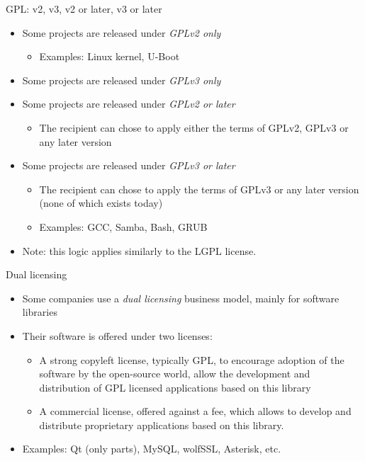 \begin{frame}{GPL: v2, v3, v2 or later, v3 or later}
  \begin{itemize}
  \item Some projects are released under {\em GPLv2 only}
    \begin{itemize}
    \item Examples: Linux kernel, U-Boot
    \end{itemize}
  \item Some projects are released under {\em GPLv3 only}
  \item Some projects are released under {\em GPLv2 or later}
    \begin{itemize}
    \item The recipient can chose to apply either the terms of GPLv2,
      GPLv3 or any later version
    \end{itemize}
  \item Some projects are released under {\em GPLv3 or later}
    \begin{itemize}
    \item The recipient can chose to apply the terms of GPLv3 or any
      later version (none of which exists today)
    \item Examples: GCC, Samba, Bash, GRUB
    \end{itemize}
  \item Note: this logic applies similarly to the LGPL license.
  \end{itemize}
\end{frame}

\begin{frame}{Dual licensing}
  \begin{itemize}
  \item Some companies use a {\em dual licensing} business model,
    mainly for software libraries
  \item Their software is offered under two licenses:
    \begin{itemize}
    \item A strong copyleft license, typically GPL, to encourage
      adoption of the software by the open-source world, allow the
      development and distribution of GPL licensed applications based
      on this library
    \item A commercial license, offered against a fee, which allows to
      develop and distribute proprietary applications based on this
      library.
    \end{itemize}
  \item Examples: Qt (only parts), MySQL, wolfSSL, Asterisk, etc.
  \end{itemize}
\end{frame}


